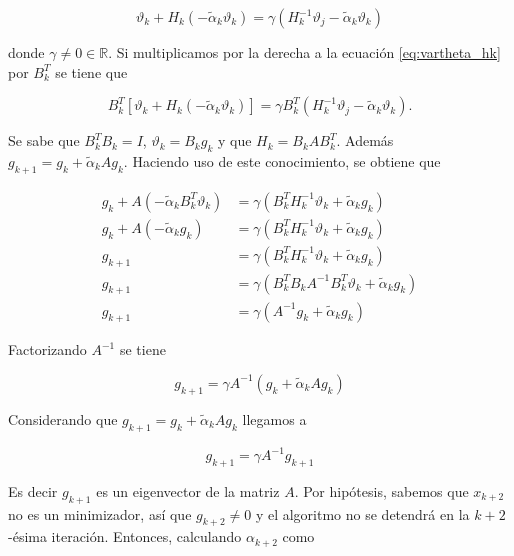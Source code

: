 \begin{equation}
	\vartheta_k+H_k(-\tilde{\alpha}_k\vartheta_k) = \gamma(H_k^{-1}\vartheta_j-\tilde{\alpha}_k\vartheta_k) \label{eq:vartheta_hk}
\end{equation}

donde $\gamma\neq 0  \in \mathbb{R}$. Si multiplicamos por la derecha a la ecuación \ref{eq:vartheta_hk} por $B_k^T$ se tiene que

\begin{equation*}
	B_k^T[\vartheta_k+H_k(-\tilde{\alpha}_k\vartheta_k)] = \gamma B_k^T(H_k^{-1}\vartheta_j-\tilde{\alpha}_k\vartheta_k).
\end{equation*}

Se sabe que $B^T_kB_k = I$, $\vartheta_k = B_kg_k$ y que $H_k = B_kAB_k^T$. Además $g_{k+1} = g_k+\tilde{\alpha}_kAg_k$. Haciendo uso de este conocimiento, se obtiene que

\begin{align*}
	g_k+A(-\tilde{\alpha}_kB^T_k\vartheta_k) & = \gamma(B_k^TH_k^{-1}\vartheta_k+\tilde{\alpha}_kg_k)       \\
	g_k+A(-\tilde{\alpha}_kg_k)              & = \gamma(B_k^TH_k^{-1}\vartheta_k+\tilde{\alpha}_kg_k)       \\
	g_{k+1}                                  & = \gamma(B_k^TH_k^{-1}\vartheta_k+\tilde{\alpha}_kg_k)       \\
	g_{k+1}                                  & = \gamma(B_k^TB_kA^{-1}B_k^T\vartheta_k+\tilde{\alpha}_kg_k) \\
	g_{k+1}                                  & = \gamma(A^{-1}g_k+\tilde{\alpha}_kg_k)
\end{align*}

Factorizando $A^{-1}$ se tiene

\begin{equation*}
	g_{k+1} = \gamma A^{-1}(g_k+\tilde{\alpha}_kAg_k)
\end{equation*}

Considerando que $g_{k+1} = g_k+\tilde{\alpha}_kAg_k$ llegamos a

\begin{equation*}
	g_{k+1} = \gamma A^{-1}g_{k+1}
\end{equation*}

Es decir $g_{k+1}$ es un eigenvector de la matriz $A$. Por hipótesis, sabemos que $x_{k+2}$ no es un minimizador, así que $g_{k+2}\neq 0$ y el algoritmo no se detendrá en la $k+2$-ésima iteración. Entonces, calculando $\alpha_{k+2}$ como

